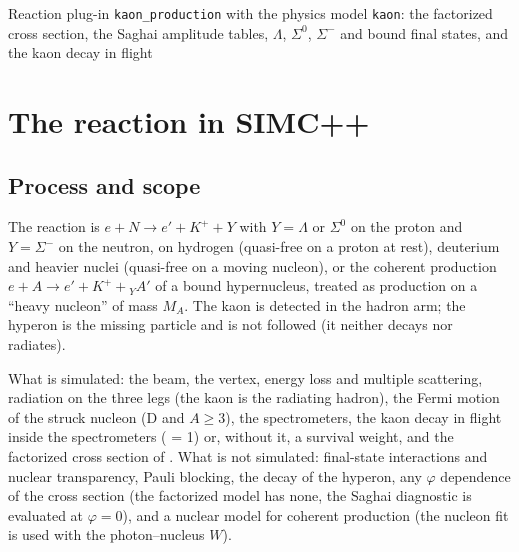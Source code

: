 \documentclass{simcnote}
\begin{document}
%
  {Reaction plug-in \texttt{kaon\_production} with the physics model \texttt{kaon}: the factorized cross section, the
   Saghai amplitude tables, \texorpdfstring{$\Lambda$, $\Sigma^0$, $\Sigma^-$}{Lambda, Sigma0, Sigma-} and bound final states, and the kaon decay in flight}
\simcnotemaketitle
{}
\simcnotetoc

\section{The reaction in SIMC++}

\subsection{Process and scope}
The reaction is $e + N \to e' + K^+ + Y$ with $Y=\Lambda$ or $\Sigma^0$ on the proton and $Y=\Sigma^-$ on the neutron,
on hydrogen (quasi-free on a proton at rest), deuterium and heavier nuclei (quasi-free on a moving nucleon), or the
coherent production $e + A \to e' + K^+ + {}_Y\!A'$ of a bound hypernucleus, treated as production on a ``heavy
nucleon'' of mass $M_A$. The kaon is detected in the hadron arm; the hyperon is the missing particle and is not
followed (it neither decays nor radiates).

What is simulated: the beam, the vertex, energy loss and multiple scattering, radiation on the three legs (the kaon is
the radiating hadron), the Fermi motion of the struck nucleon (D and $A\ge3$), the spectrometers, the kaon decay in
flight inside the spectrometers ( = 1) or, without it, a survival weight, and the factorized cross
section of . What is not simulated: final-state interactions and nuclear transparency, Pauli blocking,
the decay of the hyperon, any $\varphi$ dependence of the cross section (the factorized model has none, the Saghai
diagnostic is evaluated at $\varphi=0$), and a nuclear model for coherent production (the nucleon fit is used with the
photon--nucleus $W$).
\end{document}
